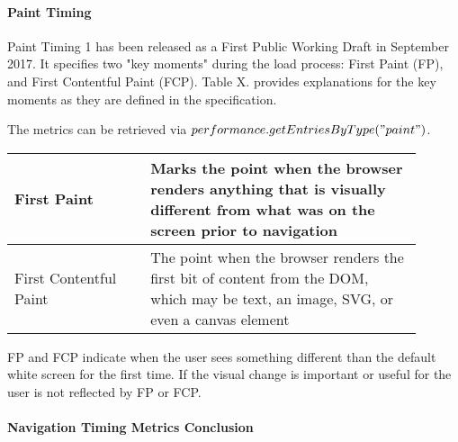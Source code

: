 \paragraph{Paint Timing}

Paint Timing 1 has been released as a First Public Working Draft in September 2017.  
It specifies two "key moments" during the load process: First Paint (FP), and First Contentful Paint (FCP).
Table X. provides explanations for the key moments as they are defined in the specification. %

The metrics can be retrieved via $performance.getEntriesByType("paint")$.

\begin{center}
\small
	\begin{tabular}{ | p{0.3\linewidth} | p{0.6\linewidth} | }
	\hline
	First Paint & Marks the point when the browser renders anything that is visually different from what was on the screen prior to navigation \\ 
	\hline
	First Contentful Paint & The point when the browser renders the first bit of content from the DOM, which may be text, an image, SVG, or even a canvas element \\  
	\hline
	\end{tabular}
\end{center}


FP and FCP indicate when the user sees something different than the default white screen for the first time.
If the visual change is important or useful for the user is not reflected by FP or FCP. %











\paragraph{Navigation Timing Metrics Conclusion}

